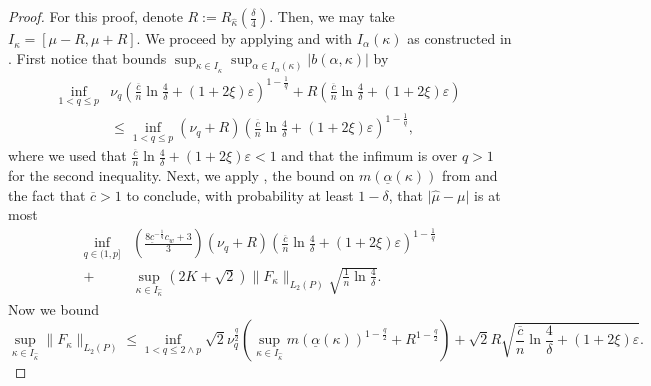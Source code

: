 \documentclass{article}
\theoremstyle{plain}
\theoremstyle{definition}
\def\eps{\varepsilon}
\begin{document}
\begin{appendix}
	{\renewcommand{\proofname}{Proof of \Cref{thm:shrinkage_concentration_adv}}
	\begin{proof}
    For this proof, denote \( R:=R_{\widehat{\kappa } }\left(\frac{\delta}{4}\right)  \). Then, we may take \( I_{\widehat{\kappa } } = [\mu - R, \mu  + R] \).
    We proceed by applying  and  with \(I_\alpha (\kappa )\) as constructed in . First notice that  bounds \( \sup_{\kappa \in I_{\widehat{\kappa } }}\sup_{\alpha\in I_\alpha (\kappa )}\lvert b(\alpha ,\kappa ) \rvert  \) by  \begin{align*}
      \inf_{1<q\le p} &\nu_q \left(\frac{\overline{c}}{n} \ln \frac{4}{\delta}+(1+2\xi )\eps \right)^{1-\frac{1}{q}} +  R \left(\frac{\overline{c}}{n} \ln \frac{4}{\delta}+(1+2\xi )\eps \right)\\ &\le  \inf_{1<q\le p} (\nu_q +R)\left(\frac{\overline{c}}{n} \ln \frac{4}{\delta}+(1+2\xi )\eps \right)^{1-\frac{1}{q}}, 
  \end{align*} 
  where we used that \( \frac{\overline{c}}{n} \ln \frac{4}{\delta}+(1+2\xi )\eps <1 \) and that the infimum is over \( q>1 \) for the second inequality. Next, we apply , the bound on \( m(\underline{\alpha }(\kappa )) \) from  and the fact that \( \overline{c}>1 \) to conclude, with probability at least \( 1-\delta \), that \( \lvert \widehat{\mu} -\mu  \rvert  \) is at most
		\begin{equation}\label{eq:bias_var}
      \begin{split}
        \inf_{q \in (1,p]}&\left(\frac{8\underline{c}^{-\frac{1}{q}}c_w+3}{3}\right)(\nu_q+R)\left(\frac{\overline{c}}{n}\ln\frac{ 4}{\delta } + (1+2\xi )\eps \right)^{1-\frac{1}{q}}\\+ &\sup_{\kappa \in I_{\widehat{\kappa } }} \left(2K+\sqrt{2}\right) \| F_\kappa  \|_{L_2(P)}\sqrt{\frac{1}{n} \ln \frac{4}{\delta}}.
      \end{split}
		\end{equation}
    Now we bound
    \begin{equation}\label{eq:F_bound}
      \sup_{\kappa \in I_{\widehat{\kappa }} }\| F_\kappa \|_{L_2(P)} \leq \inf_{1<q\le 2\wedge p }\sqrt{2} \nu_q^{\frac{q}{2}}\left(\sup_{\kappa \in I_{\widehat{\kappa }}} m(\underline{\alpha}(\kappa))^{1-\frac{q}{2}}+R ^{1-\frac{q}{2}}\right)+\sqrt{2} R \sqrt{\frac{\overline{c}}{n}\ln\frac{4}{\delta}+(1+2\xi )\eps } . 
    \end{equation} 


\end{proof}}
\end{appendix}
\end{document}
